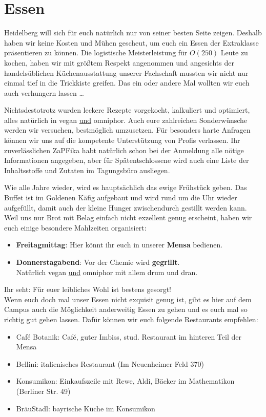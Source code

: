 
\section{Essen}
Heidelberg will sich für euch natürlich nur von seiner besten Seite zeigen. Deshalb haben wir keine Kosten und Mühen gescheut,  um euch ein Essen der Extraklasse präsentieren zu können. Die logistische Meisterleistung für $O(250)$ Leute zu kochen, haben wir mit größtem Respekt angenommen und angesichts der handelsüblichen Küchenausstattung unserer Fachschaft mussten wir nicht nur einmal tief in die Trickkiste greifen. Das ein oder andere Mal wollten wir euch auch verhungern lassen \dots

Nichtsdestotrotz wurden leckere Rezepte vorgekocht, kalkuliert und optimiert, alles natürlich in vegan \underline{und} omniphor.  Auch eure zahlreichen Sonderwünsche werden wir versuchen, bestmöglich umzusetzen. Für besonders harte Anfragen können wir uns auf die kompetente Unterstützung von Profis verlassen. Ihr zuverlässlichen ZaPFika habt natürlich schon bei der Anmeldung alle nötige Informationen angegeben, aber für Spätentschlossene wird auch eine Liste der Inhaltsstoffe und Zutaten im Tagungsbüro ausliegen.

Wie alle Jahre wieder, wird es hauptsächlich das ewige Frühstück geben. Das Buffet ist im Goldenen Käfig aufgebaut und wird rund um die Uhr wieder aufgefüllt, damit auch der kleine  Hunger zwischendurch gestillt werden kann. Weil uns nur Brot mit Belag einfach nicht exzellent genug erscheint, haben wir euch einige besondere Mahlzeiten organisiert:
  \begin{itemize}
    \item \textbf{Freitagmittag}: Hier könnt ihr euch in unserer \textbf{Mensa} bedienen.
    \item \textbf{Donnerstagabend}: Vor der Chemie wird \textbf{gegrillt}. \\
      Natürlich vegan \underline{und} omniphor mit allem drum und dran.
  \end{itemize}
  Ihr seht: Für euer leibliches Wohl ist bestens gesorgt! \\

  Wenn euch doch mal unser Essen nicht exquisit genug ist, gibt es hier auf dem Campus auch die Möglichkeit
  anderweitig Essen zu gehen und es euch mal so richtig gut gehen lassen. Dafür können wir euch
  folgende Restaurants empfehlen:
  \begin{itemize}
  \item Café Botanik: Café, guter Imbiss, stud. Restaurant im hinteren Teil der Mensa
  \item Bellini: italienisches Restaurant (Im Neuenheimer Feld 370)
  \item Konsumikon: Einkaufszeile mit Rewe, Aldi, Bäcker im Mathematikon (Berliner Str. 49)
  \item BräuStadl: bayrische Küche im Konsumikon
  \end{itemize}
